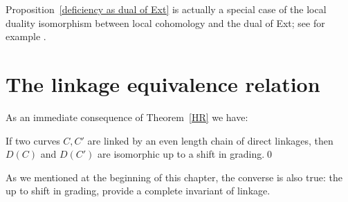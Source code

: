 Proposition~\ref{deficiency as dual of Ext} is actually a special case
of the local duality isomorphism between local cohomology and the dual
of Ext; see for example \cite[Theorem A.1.9]{MR2103875}.

\section{The linkage equivalence relation}
As an immediate consequence of Theorem~\ref{HR} we have:

\begin{corollary}[Hartshorne]
If two curves $C,C'$ are linked by an even length chain of direct
linkages, then
$D(C)$ and $D(C')$ are isomorphic up to a shift in grading.\qed
\unif
\end{corollary}

As we mentioned at the beginning of this chapter, the converse is also
true: the
%
up to shift in grading, provide a
%
complete invariant of linkage. 

